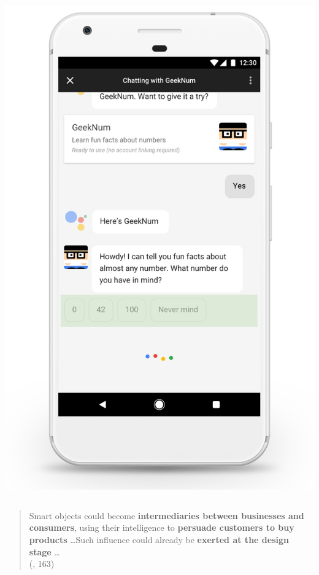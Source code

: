 \documentclass{beamer}
\begin{document}
\begin{frame}[allowframebreaks]
\begin{columns}
			\centering
			\includegraphics[width=1.05\linewidth]{images/suggestion-chip}
	\end{columns}
\framebreak

\begin{quote}
Smart objects could become \textbf{intermediaries between businesses and consumers}, using their intelligence to \textbf{persuade customers to buy products} \dots Such influence could already be \textbf{exerted at the design stage} \dots\\(\cite{brey2005freedom}, 163)
\end{quote}


\end{frame}
\end{document}
